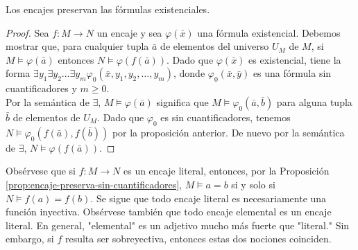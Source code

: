 \documentclass[12pt,a4paper]{book}
\newcommand{\comillas}[1]{"#1"}
\begin{document}
    \begin{proposicion}\label{prop:encaje-preserva-existenciales}
        Los encajes preservan las fórmulas existenciales.
    \end{proposicion}
    \begin{proof}
        Sea $f:M\rightarrow N$ un encaje y sea $\varphi(\bar{x})$ una fórmula existencial. Debemos mostrar que, para
        cualquier tupla $\bar{a}$ de elementos del universo $U_{M}$ de $M$, si $M\models\varphi(\bar{a})$ entonces
        $N\models\varphi(f(\bar{a}))$. Dado que $\varphi(\bar{x})$ es existencial, tiene la forma
        $\exists y_{1}\exists y_{2}\dots\exists y_{m}\varphi_{0}(\bar{x},y_{1},y_{2},\dots,y_{m})$, donde
        $\varphi_{0}(\bar{x},\bar{y})$ es una fórmula sin cuantificadores y $m\geq 0$.\\
        Por la semántica de $\exists$, $M\models\varphi(\bar{a})$ significa que $M\models\varphi_{0}(\bar{a},\bar{b})$ para
        alguna tupla $\bar{b}$ de elementos de $U_{M}$. Dado que $\varphi_{0}$ es sin cuantificadores, tenemos
        $N\models\varphi_{0}(f(\bar{a}),f(\bar{b}))$ por la proposición anterior. De nuevo por la semántica de $\exists$,
        $N\models\varphi(f(\bar{a}))$.
    \end{proof}

    Obsérvese que si $f:M\rightarrow N$ es un encaje literal, entonces, por la Proposición
    \ref{prop:encaje-preserva-sin-cuantificadores}, $M\models a=b$ si y solo si $N\models f(a)=f(b)$. Se sigue que todo
    encaje literal es necesariamente una función inyectiva. Obsérvese también que todo encaje elemental es un encaje
    literal. En general, \comillas{elemental} es un adjetivo mucho más fuerte que \comillas{literal.} Sin embargo, si $f$
    resulta ser sobreyectiva, entonces estas dos nociones coinciden.
\end{document}

